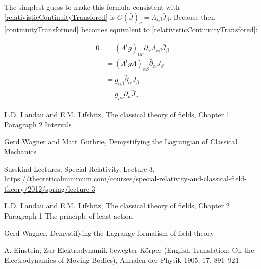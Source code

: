 \documentclass{article}
\begin{document}
The simplest guess to make this formula consistent with \ref{relativisticContinuityTransfored} is $G(\bar{J})_\nu = \Lambda_{\nu\beta} \bar{J}_\beta$.
Because then \ref{continuityTransformed} becomes equivalent to \ref{relativisticContinuityTransfored}:

\begin{align}
    0 & = (\Lambda^t g )_{\alpha\nu} \bar{\partial}_\alpha  \Lambda_{\nu\beta} \bar{J}_\beta \nonumber \\
      & = (\Lambda^t g \Lambda)_{\alpha\beta} \bar{\partial}_\alpha  \bar{J}_\beta \nonumber \\
      & = g_{\alpha\beta} \bar{\partial}_\alpha  \bar{J}_\beta \nonumber \\
      & = g_{\mu\nu} \bar{\partial}_\mu  \bar{J}_\nu \nonumber
\end{align}


\begin{thebibliography}{9}

 L.D. Landau and E.M. Lifshitz, The classical theory of fields, Chapter 1 Paragraph 2 Intervals

 Gerd Wagner and Matt Guthrie, Demystifying the Lagrangian of Classical Mechanics

 Susskind Lectures, Special Relativity, Lecture 3, \url{https://theoreticalminimum.com/courses/special-relativity-and-classical-field-theory/2012/spring/lecture-3}

 L.D. Landau and E.M. Lifshitz, The classical theory of fields, Chapter 2 Paragraph 1 The principle of least action

 Gerd Wagner, Demystifying the Lagrange formalism of field theory

 A. Einstein, Zur Elektrodynamik bewegter K\"{o}rper (English Translation: On the Electrodynamics of Moving Bodies), Annalen der Physik 1905, 17, 891--921

\end{thebibliography}
\end{document}
